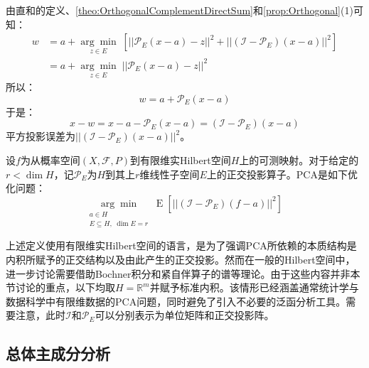 由直和的定义、\cref{theo:OrthogonalComplementDirectSum}和\cref{prop:Orthogonal}(1)可知：
\begin{align*}
	w&=a+\underset{z\in E}{\arg\min}\;[||\mathcal{P}_E(x-a)-z||^2+||(\mathcal{I}-\mathcal{P}_E)(x-a)||^2] \\
	&=a+\underset{z\in E}{\arg\min}\;||\mathcal{P}_E(x-a)-z||^2
\end{align*}
所以：
\begin{equation}\label{eq:PCAProjection}
	w=a+\mathcal{P}_E(x-a)
\end{equation}
于是：
\begin{equation*}
	x-w=x-a-\mathcal{P}_E(x-a)=(\mathcal{I}-\mathcal{P}_E)(x-a)
\end{equation*}
平方投影误差为$||(\mathcal{I}-\mathcal{P}_E)(x-a)||^2$。
\begin{definition}
	设$f$为从概率空间$(X,\mathscr{F},P)$到有限维实Hilbert空间$H$上的可测映射。对于给定的$r<\dim H$，记$\mathcal{P}_E$为$H$到其上$r$维线性子空间$E$上的正交投影算子。PCA是如下优化问题：
	\begin{equation*}
		\underset{\substack{a\in H\\E\subseteq H,\;\dim E=r}}{\arg\min}\;\operatorname{E}[||(\mathcal{I}-\mathcal{P}_E)(f-a)||^2]
	\end{equation*}
\end{definition}
\begin{note}
	上述定义使用有限维实Hilbert空间的语言，是为了强调PCA所依赖的本质结构是内积所赋予的正交结构以及由此产生的正交投影。然而在一般的Hilbert空间中，进一步讨论需要借助Bochner积分和紧自伴算子的谱等理论。由于这些内容并非本节讨论的重点，以下均取$H=\mathbb{R}^m$并赋予标准内积。该情形已经涵盖通常统计学与数据科学中有限维数据的PCA问题，同时避免了引入不必要的泛函分析工具。需要注意，此时$\mathcal{I}$和$\mathcal{P}_E$可以分别表示为单位矩阵和正交投影阵。
\end{note}

\subsection{总体主成分分析}

